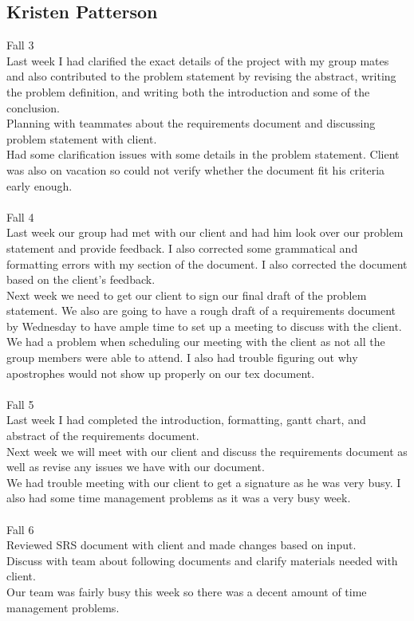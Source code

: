 \documentclass[10pt,letterpaper,onecolumn,draftclsnofoot]{IEEEtran}
\begin{document}
\subsection{Kristen Patterson}
Fall 3\\
Last week I had clarified the exact details of the project with my group mates and also contributed to the problem statement by revising the abstract, writing the problem definition, and writing both the introduction and some of the conclusion.\\ Planning with teammates about the requirements document and discussing problem statement with client.\\ Had some clarification issues with some details in the problem statement. Client was also on vacation so could not verify whether the document fit his criteria early enough.\\
\\
Fall 4\\
Last week our group had met with our client and had him look over our problem statement and provide feedback. I also corrected some grammatical and formatting errors with my section of the document. I also corrected the document based on the client's feedback.\\ Next week we need to get our client to sign our final draft of the problem statement. We also are going to have a rough draft of a requirements document by Wednesday to have ample time to set up a meeting to discuss with the client.\\ We had a problem when scheduling our meeting with the client as not all the group members were able to attend. I also had trouble figuring out why apostrophes would not show up properly on our tex document.\\
\\
Fall 5\\
Last week I had completed the introduction, formatting, gantt chart, and abstract of the requirements document.\\ Next week we will meet with our client and discuss the requirements document as well as revise any issues we have with our document.\\ We had trouble meeting with our client to get a signature as he was very busy. I also had some time management problems as it was a very busy week.\\
\\
Fall 6\\
Reviewed SRS document with client and made changes based on input.\\ Discuss with team about following documents and clarify materials needed with client.\\ Our team was fairly busy this week so there was a decent amount of time management problems.\\
\end{document}
